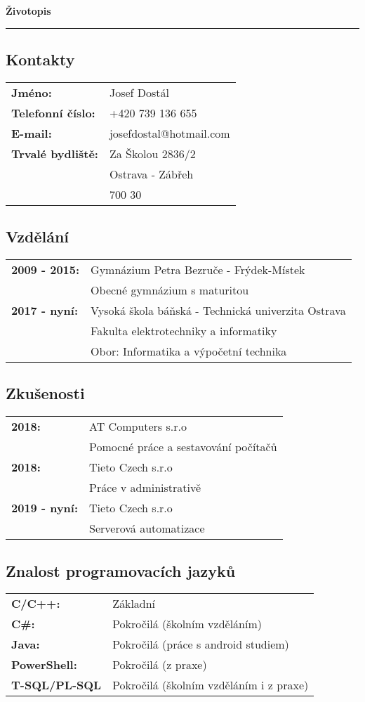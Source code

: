 \documentclass[a4paper]{article}
\begin{document}
\begin{center}
	\huge{\textbf{Životopis}}
	\par\noindent\rule{\textwidth}{0.4pt}
\end{center}

\subsection*{Kontakty}
\begin{tabular}{>{\bfseries}l l}
	Jméno: & Josef Dostál \\
	Telefonní číslo: & +420 739 136 655 \\
	E-mail: & josefdostal@hotmail.com \\
	Trvalé bydliště: & Za Školou 2836/2 \\
					 & Ostrava - Zábřeh \\
					 & 700 30
\end{tabular}

\subsection*{Vzdělání}
\begin{tabular}{>{\bfseries}l l}
	2009 - 2015: & Gymnázium Petra Bezruče - Frýdek-Místek \\
				 & Obecné gymnázium s maturitou \\
	2017 - nyní: & Vysoká škola báňská - Technická univerzita Ostrava \\
				 & Fakulta elektrotechniky a informatiky \\
				 & Obor: Informatika a výpočetní technika \\
\end{tabular}

\subsection*{Zkušenosti}
\begin{tabular}{>{\bfseries}l l}
	2018: & AT Computers s.r.o \\
		  & Pomocné práce a sestavování počítačů \\
	2018: & Tieto Czech s.r.o \\
		  & Práce v administrativě \\
	2019 - nyní: & Tieto Czech s.r.o \\
				 & Serverová automatizace
\end{tabular}

\subsection*{Znalost programovacích jazyků}
\begin{tabular}{>{\bfseries}l l}
	C/C++: & Základní \\
	C\#: & Pokročilá (školním vzděláním) \\
	Java: & Pokročilá (práce s android studiem) \\
	PowerShell: & Pokročilá (z praxe) \\
	T-SQL/PL-SQL & Pokročilá (školním vzděláním i z praxe) \\
\end{tabular}
\end{document}
